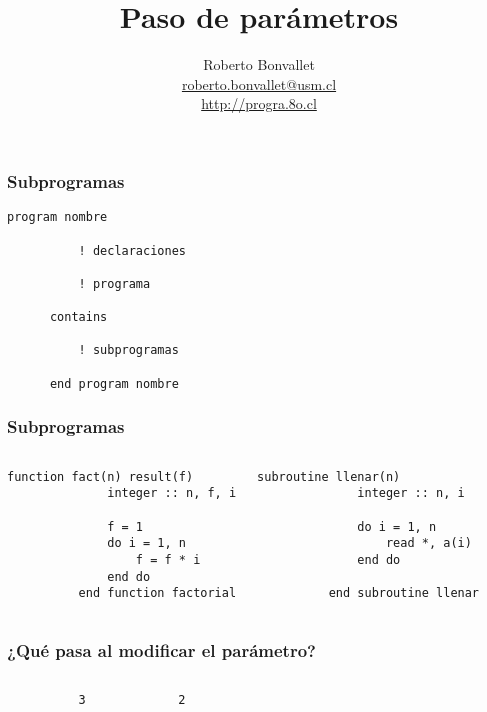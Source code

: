 \documentclass[10pt]{beamer}
\title{Paso de parámetros}
\author{
  Roberto Bonvallet \\
  \url{roberto.bonvallet@usm.cl} \\
  \url{http://progra.8o.cl}
}
\begin{document}
  \begin{frame}
    \maketitle
  \end{frame}

  \begin{frame}[fragile]
    \frametitle{Subprogramas}
    \begin{lstlisting}[frame=single,gobble=6,basicstyle=\large]
      program nombre

          ! declaraciones

          ! programa

      contains

          ! subprogramas

      end program nombre
    \end{lstlisting}
    
\end{frame}

  \begin{frame}[fragile]
    \frametitle{Subprogramas}
    \begin{columns}
        \begin{lstlisting}[frame=single,gobble=10]
          function fact(n) result(f)
              integer :: n, f, i

              f = 1
              do i = 1, n
                  f = f * i
              end do
          end function factorial
        \end{lstlisting}
        \begin{lstlisting}[frame=single,gobble=10]
          subroutine llenar(n)
              integer :: n, i

              do i = 1, n
                  read *, a(i)
              end do

          end subroutine llenar
        \end{lstlisting}
    \end{columns}

\end{frame}

  \begin{frame}[fragile]
    \frametitle{¿Qué pasa al modificar el parámetro?}
    \begin{columns}
        
        
    \end{columns}
    \pause
    \begin{columns}
        \begin{Verbatim}
          3
        \end{Verbatim}
        \begin{Verbatim}
          2
        \end{Verbatim}
    \end{columns}

\end{frame}
\end{document}
